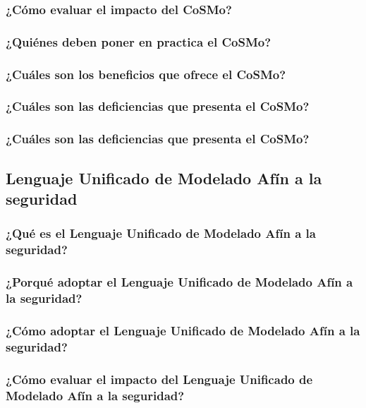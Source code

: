 \documentclass[runningheads,a4paper]{llncs}
\begin{document}
\subsubsection{¿Cómo evaluar el impacto del \gls{CoSMo}?}

\subsubsection{¿Quiénes deben poner en practica el \gls{CoSMo}?}

\subsubsection{¿Cuáles son los beneficios que ofrece el \gls{CoSMo}?}

\subsubsection{¿Cuáles son las deficiencias que presenta el \gls{CoSMo}?}

\subsubsection{¿Cuáles son las deficiencias que presenta el \gls{CoSMo}?}


\subsection{Lenguaje Unificado de Modelado Afín a la seguridad}

\subsubsection{¿Qué es el Lenguaje Unificado de Modelado Afín a la seguridad?}

\subsubsection{¿Porqué adoptar el Lenguaje Unificado de Modelado Afín a la seguridad?}

\subsubsection{¿Cómo adoptar el Lenguaje Unificado de Modelado Afín a la seguridad?}

\subsubsection{¿Cómo evaluar el impacto del Lenguaje Unificado de Modelado Afín a la seguridad?}
\end{document}
